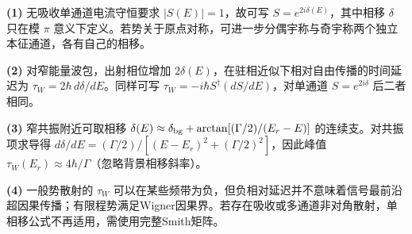 \par\noindent\textbf{(1)} 无吸收单通道电流守恒要求 \(|S(E)|=1\)，故可写 \(S=e^{2i\delta(E)}\)，其中相移 \(\delta\) 只在模 \(\pi\) 意义下定义。若势关于原点对称，可进一步分偶宇称与奇宇称两个独立本征通道，各有自己的相移。
\par\noindent\textbf{(2)} 对窄能量波包，出射相位增加 \(2\delta(E)\)，在驻相近似下相对自由传播的时间延迟为 \(\tau_W=2\hbar\,d\delta/dE\)。同样可写 \(\tau_W=-i\hbar S^\dagger(dS/dE)\)，对单通道 \(S=e^{2i\delta}\) 后二者相同。
\par\noindent\textbf{(3)} 窄共振附近可取相移 \(\delta(E)\approx\delta_{\rm bg}+\arctan[(\Gamma/2)/(E_r-E)]\) 的连续支。对共振项求导得 \(d\delta/dE=(\Gamma/2)/[(E-E_r)^2+(\Gamma/2)^2]\)，因此峰值 \(\tau_W(E_r)\approx4\hbar/\Gamma\)（忽略背景相移斜率）。
\par\noindent\textbf{(4)} 一般势散射的 \(\tau_W\) 可以在某些频带为负，但负相对延迟并不意味着信号最前沿超因果传播；有限程势满足Wigner因果界。若存在吸收或多通道非对角散射，单相移公式不再适用，需使用完整Smith矩阵。
